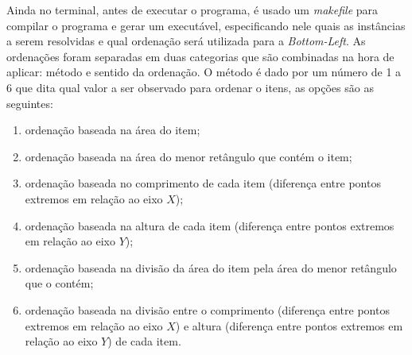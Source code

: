 \documentclass[12pt, openright, twoside, a4paper, english, brazilian]{USPSC-classe/USPSC}
\begin{document}
Ainda no terminal, antes de executar o programa, é usado um {\it makefile} para compilar o programa e gerar um executável, especificando nele quais as instâncias a serem resolvidas e qual ordenação será utilizada para a {\it Bottom-Left}. As ordenações foram separadas em duas categorias que são combinadas na hora de aplicar: método e sentido da ordenação. O método é dado por um número de 1 a 6 que dita qual valor a ser observado para ordenar o itens, as opções são as seguintes:

\begin{enumerate}
    \item ordenação baseada na área do item;
    \item ordenação baseada na área do menor retângulo que contém o item;
    \item ordenação baseada no comprimento de cada item (diferença entre pontos extremos em relação ao eixo $X$);
    \item ordenação baseada na altura de cada item (diferença entre pontos extremos em relação ao eixo $Y$);
    \item ordenação baseada na divisão da área do item pela área do menor retângulo que o contém;
    \item ordenação baseada na divisão entre o comprimento (diferença entre pontos extremos em relação ao eixo $X$) e altura (diferença entre pontos extremos em relação ao eixo $Y$) de cada item.
\end{enumerate}
\end{document}
